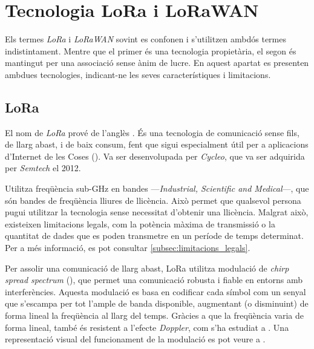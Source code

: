 \documentclass{tfgitic}[2024/07/01]
\begin{document}
\section{Tecnologia LoRa i LoRaWAN}
Els termes \emph{LoRa} i \emph{LoRaWAN} sovint es confonen i s'utilitzen ambdós termes indistintament. Mentre que el primer és una tecnologia propietària, el segon és mantingut per una associació sense ànim de lucre. En aquest apartat es presenten ambdues tecnologies, indicant-ne les seves característiques i limitacions.

\subsection{LoRa}
El nom de \emph{LoRa} prové de l'anglès . És una tecnologia de comunicació sense fils, de llarg abast, i de baix consum, fent que sigui especialment útil per a aplicacions d'Internet de les Coses (). Va ser desenvolupada per \emph{Cycleo}, que va ser adquirida per \emph{Semtech} el 2012.

Utilitza freqüència sub-GHz en bandes  ---\emph{Industrial, Scientific and Medical}---, que són bandes de freqüència lliures de llicència. Això permet que qualsevol persona pugui utilitzar la tecnologia sense necessitat d'obtenir una llicència. Malgrat això, existeixen limitacions legals, com la potència màxima de transmissió o la quantitat de dades que es poden transmetre en un període de temps determinat. Per a més informació, es pot consultar \ref{subsec:limitacions_legals}.

Per assolir una comunicació de llarg abast, LoRa utilitza modulació de \emph{chirp spread spectrum} (), que permet una comunicació robusta i fiable en entorns amb interferències. Aquesta modulació es basa en codificar cada símbol com un senyal que s'escampa per tot l'ample de banda disponible, augmentant (o disminuint) de forma lineal la freqüència al llarg del temps. Gràcies a que la freqüència varia de forma lineal, també és resistent a l'efecte \emph{Doppler}, com s'ha estudiat a \cite{doroshkin_experimental_2019}. Una representació visual del funcionament de la modulació  es pot veure a \cite{richard_wenner_lora_2017}.
\end{document}
